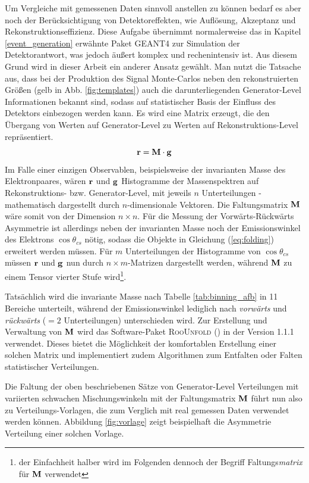 Um Vergleiche mit gemessenen Daten sinnvoll anstellen zu können bedarf es
aber noch der Berücksichtigung von Detektoreffekten, wie Auflösung, Akzeptanz
und Rekonstruktionseffizienz. Diese Aufgabe übernimmt normalerweise das in
Kapitel \ref{event_generation} erwähnte Paket \textsc{GEANT4} zur Simulation
der Detektorantwort, was jedoch äußert komplex und rechenintensiv ist. Aus
diesem Grund wird in dieser Arbeit ein anderer Ansatz gewählt. Man nutzt die
Tatsache aus, dass bei der Produktion des Signal Monte-Carlos neben den
rekonstruierten Größen (gelb in Abb. \ref{fig:templates}) auch die
darunterliegenden Generator-Level Informationen bekannt sind, sodass auf
statistischer Basis der Einfluss des Detektors einbezogen werden kann. Es wird
eine Matrix erzeugt, die den Übergang von Werten auf Generator-Level zu Werten
auf Rekonstruktions-Level repräsentiert.
\begin{equation}
    \bf r = M \cdot \bf{g}
    \label{eq:folding}
\end{equation}
Im Falle einer einzigen Observablen, beispielsweise der invarianten Masse des
Elektronpaares, wären $\bf{r}$ und $\bf{g}$ Histogramme der Massenspektren auf
Rekonstruktions- bzw. Generator-Level, mit jeweils $n$ Unterteilungen -
mathematisch dargestellt durch $n$-dimensionale Vektoren. Die Faltungsmatrix
$\bf{M}$ wäre somit von der Dimension $n \times n$. Für die Messung der
Vorwärts-Rückwärts Asymmetrie ist allerdings neben der invarianten Masse noch
der Emissionswinkel des Elektrons $\cos\theta_{cs}$ nötig, sodass die Objekte
in Gleichung (\ref{eq:folding}) erweitert werden müssen. Für $m$ Unterteilungen
der Histogramme von $\cos\theta_{cs}$ müssen $\bf{r}$ und $\bf{g}$ nun durch 
$n \times m$-Matrizen dargestellt werden, während $\bf{M}$ zu einem Tensor
vierter Stufe wird\footnote{der Einfachheit halber wird im Folgenden dennoch
der Begriff Faltungs\textit{matrix} für $\bf{M}$ verwendet}.

Tatsächlich wird die invariante Masse nach Tabelle \ref{tab:binning_afb} in 11
Bereiche unterteilt, während der Emissionswinkel lediglich nach
\textit{vorwärts} und \textit{rückwärts} ($=2$ Unterteilungen) unterschieden
wird. Zur Erstellung und Verwaltung von $\bf{M}$ wird das Software-Paket
\textsc{RooUnfold} (\cite{2011arXiv1105.1160A}) in der Version 1.1.1 verwendet.
Dieses bietet die Möglichkeit der komfortablen Erstellung einer solchen Matrix
und implementiert zudem Algorithmen zum Entfalten oder Falten statistischer
Verteilungen.

Die Faltung der oben beschriebenen Sätze von Generator-Level Verteilungen mit
variierten schwachen Mischungswinkeln mit der Faltungsmatrix $\bf{M}$ führt nun
also zu Verteilungs-Vorlagen, die zum Verglich mit real gemessen Daten
verwendet werden können. Abbildung \ref{fig:vorlage} zeigt beispielhaft die
Asymmetrie Verteilung einer solchen Vorlage.

